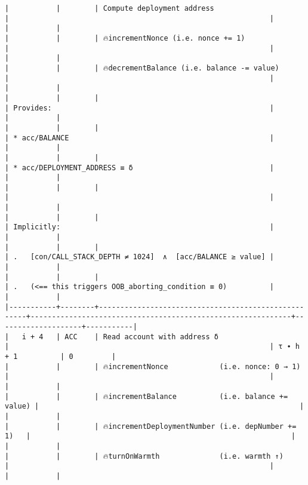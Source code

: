 \documentclass[varwidth=\maxdimen,margin=0.5cm,multi={verbatim}]{standalone}
\begin{document}
\begin{verbatim}
|           |        | Compute deployment address                          |                                                             |                    |           |
|           |        | 🔥incrementNonce (i.e. nonce += 1)                  |                                                             |                    |           |
|           |        | 🔥decrementBalance (i.e. balance -= value)          |                                                             |                    |           |
|           |        |                                                     | Provides:                                                   |                    |           |
|           |        |                                                     | * acc/BALANCE                                               |                    |           |
|           |        |                                                     | * acc/DEPLOYMENT_ADDRESS ≡ δ                                |                    |           |
|           |        |                                                     |                                                             |                    |           |
|           |        |                                                     | Implicitly:                                                 |                    |           |
|           |        |                                                     | .   [con/CALL_STACK_DEPTH ≠ 1024]  ∧  [acc/BALANCE ≥ value] |                    |           |
|           |        |                                                     | .   (<== this triggers OOB_aborting_condition ≡ 0)          |                    |           |
|-----------+--------+-----------------------------------------------------+-------------------------------------------------------------+--------------------+-----------|
|   i + 4   | ACC    | Read account with address δ                         |                                                             | τ ∙ h + 1          | 0         |
|           |        | 🔥incrementNonce            (i.e. nonce: 0 → 1)     |                                                             |                    |           |
|           |        | 🔥incrementBalance          (i.e. balance += value) |                                                             |                    |           |
|           |        | 🔥incrementDeploymentNumber (i.e. depNumber += 1)   |                                                             |                    |           |
|           |        | 🔥turnOnWarmth              (i.e. warmth ↑)         |                                                             |                    |           |

\end{verbatim}
\end{document}
